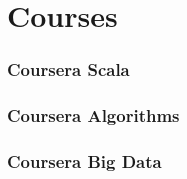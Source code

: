 \documentclass[11pt]{article}
\begin{document}
\section*{Courses}
\label{sec:org0ad43c8}
\subsubsection*{Coursera Scala}
\label{sec:orge488462}
\subsubsection*{Coursera Algorithms}
\label{sec:org26355c1}
\subsubsection*{Coursera Big Data}
\label{sec:orgfdd870b}
\end{document}
